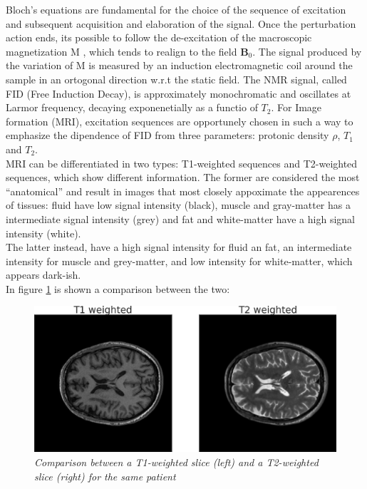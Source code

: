 \documentclass[12pt,a4paper]{report}
\begin{document}
Bloch's equations are fundamental for the choice of the sequence of excitation and subsequent acquisition and elaboration of the signal.
Once the perturbation action ends, its possible to follow the de-excitation of the macroscopic magnetization M , which tends to realign to the field $\bm{B}_0$. The signal produced by the variation of M is measured by an induction electromagnetic coil around the sample in an ortogonal direction w.r.t the static field.
The NMR signal, called FID (Free Induction Decay), is approximately monochromatic and oscillates at Larmor frequency, decaying exponenetially as a functio of $T_2$. 
For Image formation (MRI), excitation sequences are opportunely chosen in such a way to emphasize the dipendence of FID from three parameters: protonic density $\rho$, $T_1$ and $T_2$.
\\
MRI can be differentiated in two types: T1-weighted sequences and T2-weighted sequences, which show different information.
The former are considered the most ``anatomical'' and result in images that most closely appoximate the appearences of tissues: fluid  have low signal intensity (black), muscle and gray-matter has a intermediate signal intensity (grey) and fat and white-matter have a high signal intensity (white).
\\
The latter instead, have a high signal intensity for fluid an fat, an intermediate intensity for muscle and grey-matter, and low intensity for white-matter, which appears dark-ish.
\\
In figure \ref{fig:diff-t1-t2} is shown a comparison between the two:

\begin{figure}[H]
 \centering
 \includegraphics[scale=0.4]{./images/t1_t2_diff.png}
 \caption{\it Comparison between a T1-weighted slice (left) and a T2-weighted slice (right) for the same patient}
 \label{fig:diff-t1-t2}
\end{figure}
\end{document}
